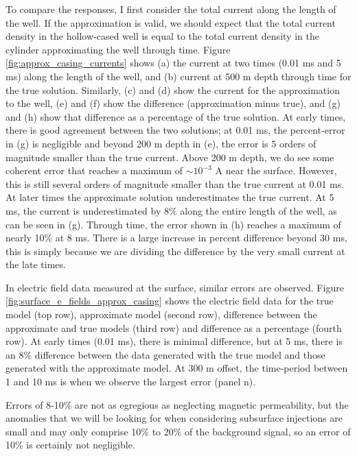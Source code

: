 To compare the responses, I first consider the total current along the length of the well. If the approximation is valid, we should expect that the total current density in the hollow-cased well is equal to the total current density in the cylinder approximating the well through time. Figure \ref{fig:approx_casing_currents} shows (a) the current at two times (0.01 ms and 5 ms) along the length of the well, and (b) current at 500 m depth through time for the true solution. Similarly, (c) and (d) show the current for the approximation to the well, (e) and (f) show the difference (approximation minus true), and (g) and (h) show that difference as a percentage of the true solution. At early times, there is good agreement between the two solutions; at 0.01 ms, the percent-error in (g) is negligible and beyond 200 m depth in (e), the error is 5 orders of magnitude smaller than the true current. Above 200 m depth, we do see some coherent error that reaches a maximum of $\sim10^{-3}$ A near the surface. However, this is still several orders of magnitude smaller than the true current at 0.01 ms. At later times the approximate solution underestimates the true current. At 5 ms, the current is underestimated by 8\% along the entire length of the well, as can be seen in (g). Through time, the error shown in (h) reaches a maximum of nearly 10\% at 8 ms. There is a large increase in percent difference beyond 30 ms, this is simply because we are dividing the difference by the very small current at the late times.



In electric field data measured at the surface, similar errors are observed. Figure \ref{fig:surface_e_fields_approx_casing} shows the electric field data for the true model (top row), approximate model (second row), difference between the approximate and true models (third row) and difference as a percentage (fourth row). At early times (0.01 ms), there is minimal difference, but at 5 ms, there is an 8\% difference between the data generated with the true model and those generated with the approximate model. At 300 m offset, the time-period between 1 and 10 ms is when we observe the largest error (panel n).

Errors of 8-10\% are not as egregious as neglecting magnetic permeability, but the anomalies that we will be looking for when considering subsurface injections are small and may only comprise 10\% to 20\% of the background signal, so an error of 10\% is certainly not negligible.

